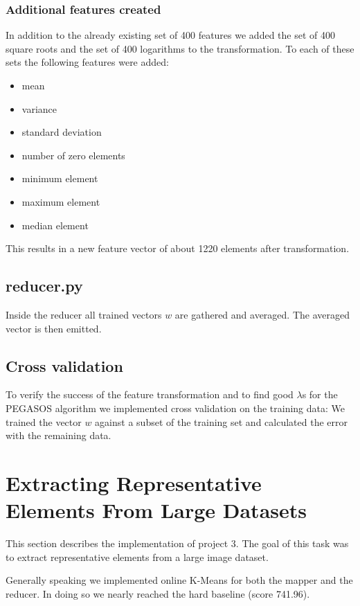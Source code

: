 \documentclass[a4paper, 11pt]{article}
\begin{document}
\subsubsection{Additional features created}

In addition to the already existing set of 400 features we added the set of 400
square roots and the set of 400 logarithms to the transformation. To each of
these sets the following features were added:

\begin{itemize}
\item mean
\item variance
\item standard deviation
\item number of zero elements
\item minimum element
\item maximum element
\item median element
\end{itemize}

This results in a new feature vector of about 1220 elements after transformation.

\subsection{reducer.py}

Inside the reducer all trained vectors $w$ are gathered and averaged. The
averaged vector is then emitted.

\subsection{Cross validation}

To verify the success of the feature transformation and to find good $\lambda$s
for the PEGASOS algorithm we implemented cross validation on the training data:
We trained the vector $w$ against a subset of the training set and calculated
the error with the remaining data.

\section{Extracting Representative Elements From Large Datasets}
This section describes the implementation of project 3. The goal of this task was to extract representative elements from a large image dataset.

Generally speaking we implemented online K-Means for both the mapper and the reducer. In doing so we nearly reached the hard baseline (score 741.96).
\end{document}
